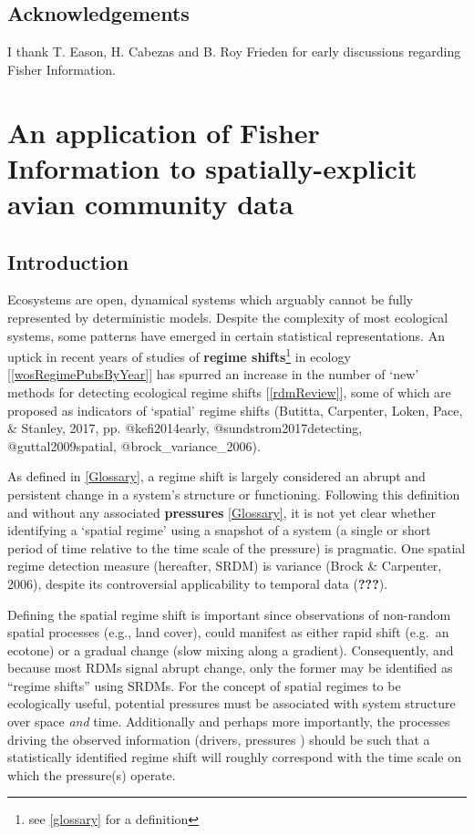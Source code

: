 \documentclass[12pt,twoside,openany]{reedthesis}
\begin{document}
\hypertarget{acknowledgements}{%
\section{Acknowledgements}\label{acknowledgements}}

I thank T. Eason, H. Cabezas and B. Roy Frieden for early discussions regarding Fisher Information.

\hypertarget{fisherSpatial}{%
\chapter{An application of Fisher Information to spatially-explicit avian community data}\label{fisherSpatial}}

\hypertarget{introduction-2}{%
\section{Introduction}\label{introduction-2}}

Ecosystems are open, dynamical systems which arguably cannot be fully represented by deterministic models. Despite the complexity of most ecological systems, some patterns have emerged in certain statistical representations. An uptick in recent years of studies of \textbf{regime shifts}\footnote{see \ref{glossary} for a definition} in ecology {[}\ref{wosRegimePubsByYear}{]} has spurred an increase in the number of `new' methods for detecting ecological regime shifts {[}\ref{rdmReview}{]}, some of which are proposed as indicators of `spatial' regime shifts (Butitta, Carpenter, Loken, Pace, \& Stanley, 2017, pp. @kefi2014early, @sundstrom2017detecting, @guttal2009spatial, @brock\_variance\_2006).

As defined in \ref{Glossary}, a regime shift is largely considered an abrupt and persistent change in a system's structure or functioning. Following this definition and without any associated \textbf{pressures} \ref{Glossary}, it is not yet clear whether identifying a `spatial regime' using a snapshot of a system (a single or short period of time relative to the time scale of the pressure) is pragmatic. One spatial regime detection measure (hereafter, SRDM) is variance (Brock \& Carpenter, 2006), despite its controversial applicability to temporal data ({\textbf{???}}).

Defining the spatial regime shift is important since observations of non-random spatial processes (e.g., land cover), could manifest as either rapid shift (e.g.~an ecotone) or a gradual change (slow mixing along a gradient). Consequently, and because most RDMs signal abrupt change, only the former may be identified as ``regime shifts'' using SRDMs. For the concept of spatial regimes to be ecologically useful, potential pressures must be associated with system structure over space \emph{and} time. Additionally and perhaps more importantly, the processes driving the observed information (drivers, pressures ) should be such that a statistically identified regime shift will roughly correspond with the time scale on which the pressure(s) operate.
\end{document}
